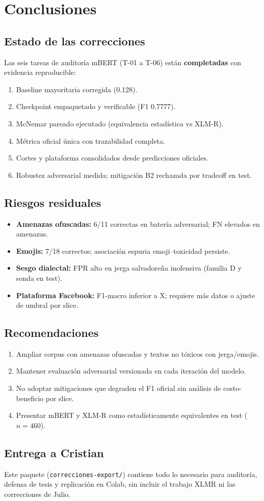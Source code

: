 \chapter{Conclusiones}

\section{Estado de las correcciones}

Las seis tareas de auditoría mBERT (T-01 a T-06) están \textbf{completadas} con evidencia reproducible:

\begin{enumerate}[noitemsep]
  \item Baseline mayoritaria corregida (0.128).
  \item Checkpoint empaquetado y verificable (F1 0.7777).
  \item McNemar pareado ejecutado (equivalencia estadística vs XLM-R).
  \item Métrica oficial única con trazabilidad completa.
  \item Cortes y plataforma consolidados desde predicciones oficiales.
  \item Robustez adversarial medida; mitigación B2 rechazada por tradeoff en test.
\end{enumerate}

\section{Riesgos residuales}

\begin{itemize}[noitemsep]
  \item \textbf{Amenazas ofuscadas:} 6/11 correctas en batería adversarial; FN elevados en amenazas.
  \item \textbf{Emojis:} 7/18 correctos; asociación espuria emoji--toxicidad persiste.
  \item \textbf{Sesgo dialectal:} FPR alto en jerga salvadoreña inofensiva (familia D y sonda en test).
  \item \textbf{Plataforma Facebook:} F1-macro inferior a X; requiere más datos o ajuste de umbral por slice.
\end{itemize}

\section{Recomendaciones}

\begin{enumerate}[noitemsep]
  \item Ampliar corpus con amenazas ofuscadas y textos no tóxicos con jerga/emojis.
  \item Mantener evaluación adversarial versionada en cada iteración del modelo.
  \item No adoptar mitigaciones que degraden el F1 oficial sin análisis de costo-beneficio por slice.
  \item Presentar mBERT y XLM-R como estadísticamente equivalentes en test ($n=460$).
\end{enumerate}

\section{Entrega a Cristian}

Este paquete (\texttt{correcciones-export/}) contiene todo lo necesario para auditoría, defensa de tesis y replicación en Colab, sin incluir el trabajo XLMR ni las correcciones de Julio.

